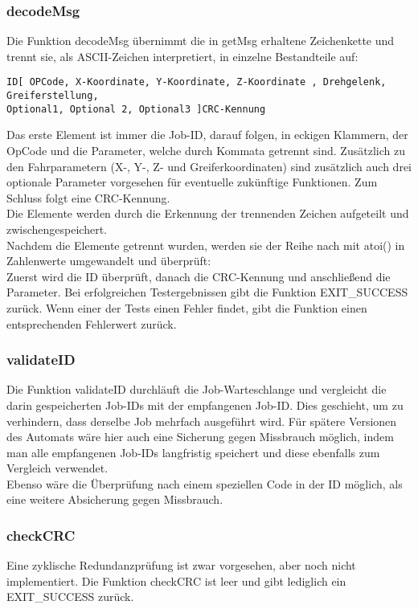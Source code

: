 \documentclass{scrartcl}
\begin{document}
\subsubsection{decodeMsg}
Die Funktion decodeMsg übernimmt die in getMsg erhaltene Zeichenkette und trennt sie, als ASCII-Zeichen interpretiert, in einzelne Bestandteile auf:
\begin{verbatim}ID[ OPCode, X-Koordinate, Y-Koordinate, Z-Koordinate , Drehgelenk, Greiferstellung, 
Optional1, Optional 2, Optional3 ]CRC-Kennung\end{verbatim}

Das erste Element ist immer die Job-ID, darauf folgen, in eckigen Klammern, der OpCode und die Parameter, welche durch Kommata getrennt sind. Zusätzlich zu den Fahrparametern (X-, Y-, Z- und Greiferkoordinaten) sind zusätzlich auch drei optionale Parameter vorgesehen für eventuelle zukünftige Funktionen. Zum Schluss folgt eine CRC-Kennung.\\
Die Elemente werden durch die Erkennung der trennenden Zeichen aufgeteilt und zwischengespeichert.\\

Nachdem die Elemente getrennt wurden, werden sie der Reihe nach mit atoi() in Zahlenwerte umgewandelt und überprüft:\\
Zuerst wird die ID überprüft, danach die CRC-Kennung und anschließend die Parameter. Bei erfolgreichen Testergebnissen  gibt die Funktion EXIT\_SUCCESS zurück. Wenn einer der Tests einen Fehler findet, gibt die Funktion einen entsprechenden Fehlerwert zurück. 


\subsubsection{validateID}
Die Funktion validateID durchläuft die Job-Warteschlange und vergleicht die darin gespeicherten Job-IDs mit der empfangenen Job-ID. Dies geschieht, um zu verhindern, dass derselbe Job mehrfach ausgeführt wird. Für spätere Versionen des Automats wäre hier auch eine Sicherung gegen Missbrauch möglich, indem man alle empfangenen Job-IDs langfristig speichert und diese ebenfalls zum Vergleich verwendet. \\
Ebenso wäre die Überprüfung nach einem speziellen Code in der ID möglich, als eine weitere Absicherung gegen Missbrauch.


\subsubsection{checkCRC}
Eine zyklische Redundanzprüfung ist zwar vorgesehen, aber noch nicht implementiert. Die Funktion checkCRC ist leer und gibt lediglich ein EXIT\_SUCCESS zurück.
\end{document}
